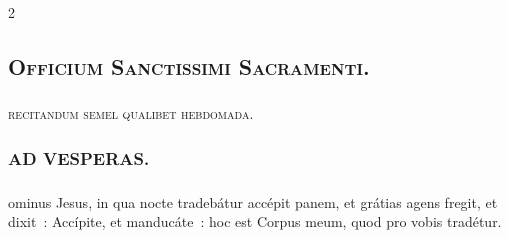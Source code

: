 \documentclass[9pt,twoside]{extarticle}
\begin{document}
\begin{multicols}{2}
\subsection*{\center \textsc{Officium Sanctissimi Sacramenti.}}
\subsubsection*{\center {}}
\begin{center}\textsc{recitandum semel qualibet hebdomada.}\end{center}
\subsubsection*{\center \textsc{AD VESPERAS.}}
\subsubsection*{}
ominus Jesus, in qua nocte tradebátur accépit panem, et grátias agens fregit, et dixit~: Accípite, et manducáte~: hoc est Corpus meum, quod pro vobis tradétur.


\end{multicols}
\end{document}
